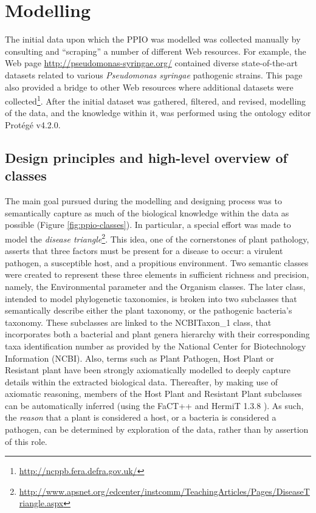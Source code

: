 \documentclass[sw]{iosart2c}
\newcommand{\myurl}[1]{\footnote{\url{#1}}}
\begin{document}
\section{Modelling}

The initial data upon which the PPIO was modelled was collected manually by consulting and ``scraping'' a number of different Web resources. For example, the Web page \url{http://pseudomonas-syringae.org/} contained diverse state-of-the-art datasets related to various {\itshape Pseudomonas syringae} pathogenic strains. This page also provided a bridge to other Web resources where additional datasets were collected\myurl{http://ncppb.fera.defra.gov.uk/}. After the initial dataset was gathered, filtered, and revised, modelling of the data, and the knowledge within it, was performed using the ontology editor Prot\'eg\'e v4.2.0.

\subsection{Design principles and high-level overview of classes}

The main goal pursued during the modelling and designing process was to semantically capture as much of the biological knowledge within the data as possible (Figure \ref{fig:ppio-classes}). In particular, a special effort was made to model the {\itshape disease triangle}\myurl{http://www.apsnet.org/edcenter/instcomm/TeachingArticles/Pages/DiseaseTriangle.aspx}. This idea, one of the cornerstones of plant pathology, asserts that three factors must be present for a disease to occur: a virulent pathogen, a susceptible host, and a propitious environment. Two semantic classes were created to represent these three elements in sufficient richness and precision, namely, the {\sf Environmental parameter} and the {\sf Organism} classes. The later class, intended to model phylogenetic taxonomies, is broken into two subclasses that semantically describe either the plant taxonomy, or the pathogenic bacteria's taxonomy. These subclasses are linked to the {\sf NCBITaxon\_1} class, that incorporates both a bacterial and plant genera hierarchy with their corresponding taxa identification number as provided by the National Center for Biotechnology Information (NCBI). Also, terms such as {\sf Plant Pathogen}, {\sf Host Plant} or {\sf Resistant plant} have been strongly axiomatically modelled to deeply capture details within the extracted biological data.  Thereafter, by making use of axiomatic reasoning, members of the {\sf Host Plant} and {\sf Resistant Plant} subclasses can be automatically inferred (using the FaCT++ \cite{TsHo06a} and HermiT 1.3.8 \cite{hermit}). As such, the {\itshape reason} that a plant is considered a host, or a bacteria is considered a pathogen, can be determined by exploration of the data, rather than by assertion of this role.
\end{document}
